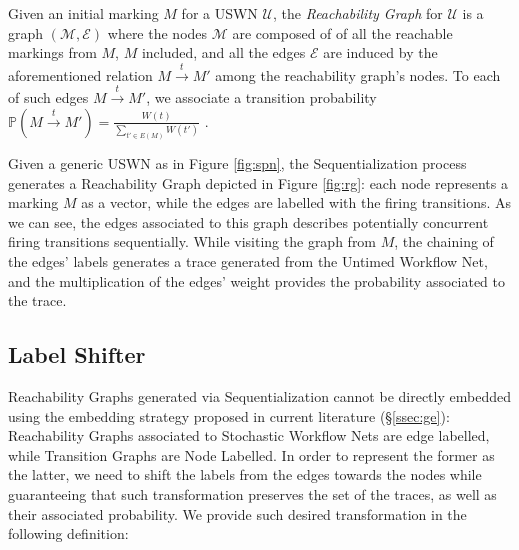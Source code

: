 \begin{definition}
	Given an initial marking $M$ for a USWN $\mathcal{U}$,  the \textit{Reachability Graph} for $\mathcal{U}$ is a graph $(\mathcal{M},\mathcal{E})$ where the nodes  $\mathcal{M}$ are composed of of all the reachable markings from $M$, $M$ included, and all the edges $\mathcal{E}$ are induced by the aforementioned relation $M\overset{t}{\to}M'$ among the reachability graph's nodes. To each of such edges $M\overset{t}{\to}M'$, we associate a transition probability $\mathbb{P}\left(M\overset{t}{\to}M'\right)=\frac{W(t)}{\sum_{t'\in E(M)}W(t')}$ \cite{spdwe}. 
\end{definition}

\begin{example}
Given a generic USWN as in Figure \ref{fig:spn}, the Sequentialization process generates a Reachability Graph depicted in Figure \ref{fig:rg}: each node represents a marking $M$ as a vector, while the edges are labelled with the firing transitions. As we can see, the edges associated to this graph describes potentially concurrent firing transitions sequentially. While visiting the graph from $M$, the chaining of the edges' labels generates a trace generated from the Untimed Workflow Net, and the multiplication of the edges' weight provides the probability associated to the trace.
\end{example}



\subsection{Label Shifter}\label{sec:LSift}
Reachability Graphs generated via Sequentialization cannot be directly embedded using the embedding strategy proposed in current literature (\S\ref{ssec:ge}):  Reachability Graphs associated to Stochastic Workflow Nets are edge labelled, while Transition Graphs are Node Labelled. In order to represent the former as the latter, we need to shift the labels from the edges towards the nodes  while guaranteeing that such transformation preserves the set of the traces, as well as their associated probability. We provide such desired transformation in the following definition:

